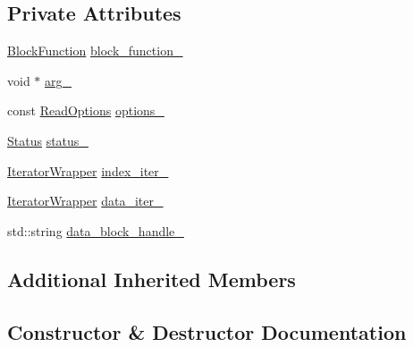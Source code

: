 \subsection*{Private Attributes}
\begin{DoxyCompactItemize}
\item 
\hyperlink{namespaceleveldb_1_1anonymous__namespace_02two__level__iterator_8cc_03_a5c9432df43722461670c1721d5b43f33}{Block\+Function} \hyperlink{classleveldb_1_1anonymous__namespace_02two__level__iterator_8cc_03_1_1_two_level_iterator_a40c641e9c7f9f1b4d0e7252bbc6fb234}{block\+\_\+function\+\_\+}
\item 
void $\ast$ \hyperlink{classleveldb_1_1anonymous__namespace_02two__level__iterator_8cc_03_1_1_two_level_iterator_a4043ec2cc4c3bcbaf76fa08b26547e1a}{arg\+\_\+}
\item 
const \hyperlink{structleveldb_1_1_read_options}{Read\+Options} \hyperlink{classleveldb_1_1anonymous__namespace_02two__level__iterator_8cc_03_1_1_two_level_iterator_a59942395b26630f9b6cc6aa86873532a}{options\+\_\+}
\item 
\hyperlink{classleveldb_1_1_status}{Status} \hyperlink{classleveldb_1_1anonymous__namespace_02two__level__iterator_8cc_03_1_1_two_level_iterator_a5a6d562429311dc21c5ad6e9c5988508}{status\+\_\+}
\item 
\hyperlink{classleveldb_1_1_iterator_wrapper}{Iterator\+Wrapper} \hyperlink{classleveldb_1_1anonymous__namespace_02two__level__iterator_8cc_03_1_1_two_level_iterator_a49a322a6b6544ca750467b605a1dea09}{index\+\_\+iter\+\_\+}
\item 
\hyperlink{classleveldb_1_1_iterator_wrapper}{Iterator\+Wrapper} \hyperlink{classleveldb_1_1anonymous__namespace_02two__level__iterator_8cc_03_1_1_two_level_iterator_abdeeb9598dfdad58f2eec64f32cf2bf6}{data\+\_\+iter\+\_\+}
\item 
std\+::string \hyperlink{classleveldb_1_1anonymous__namespace_02two__level__iterator_8cc_03_1_1_two_level_iterator_a70b5c46715a819df9d0410c077038408}{data\+\_\+block\+\_\+handle\+\_\+}
\end{DoxyCompactItemize}
\subsection*{Additional Inherited Members}


\subsection{Constructor \& Destructor Documentation}
\hypertarget{classleveldb_1_1anonymous__namespace_02two__level__iterator_8cc_03_1_1_two_level_iterator_ac1d49d64903c715e0b4a38ff1203b299}{}
